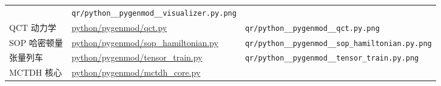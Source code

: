 \documentclass[
]{ctexbook}
\begin{document}
\begin{longtable}[]{@{}lll@{}}
\begin{minipage}[t]{0.30\columnwidth}
\end{minipage} & \begin{minipage}[t]{0.30\columnwidth}\raggedright
\texttt{qr/python\_\_pygenmod\_\_visualizer.py.png}\strut
\end{minipage}\tabularnewline
\begin{minipage}[t]{0.30\columnwidth}\raggedright
QCT 动力学\strut
\end{minipage} & \begin{minipage}[t]{0.30\columnwidth}\raggedright
\href{https://github.com/l1Ha/QuantumGeneralModule/blob/main/python/pygenmod/qct.py}{python/pygenmod/qct.py}\strut
\end{minipage} & \begin{minipage}[t]{0.30\columnwidth}\raggedright
\texttt{qr/python\_\_pygenmod\_\_qct.py.png}\strut
\end{minipage}\tabularnewline
\begin{minipage}[t]{0.30\columnwidth}\raggedright
SOP 哈密顿量\strut
\end{minipage} & \begin{minipage}[t]{0.30\columnwidth}\raggedright
\href{https://github.com/l1Ha/QuantumGeneralModule/blob/main/python/pygenmod/sop_hamiltonian.py}{python/pygenmod/sop\_hamiltonian.py}\strut
\end{minipage} & \begin{minipage}[t]{0.30\columnwidth}\raggedright
\texttt{qr/python\_\_pygenmod\_\_sop\_hamiltonian.py.png}\strut
\end{minipage}\tabularnewline
\begin{minipage}[t]{0.30\columnwidth}\raggedright
张量列车\strut
\end{minipage} & \begin{minipage}[t]{0.30\columnwidth}\raggedright
\href{https://github.com/l1Ha/QuantumGeneralModule/blob/main/python/pygenmod/tensor_train.py}{python/pygenmod/tensor\_train.py}\strut
\end{minipage} & \begin{minipage}[t]{0.30\columnwidth}\raggedright
\texttt{qr/python\_\_pygenmod\_\_tensor\_train.py.png}\strut
\end{minipage}\tabularnewline
\begin{minipage}[t]{0.30\columnwidth}\raggedright
MCTDH 核心\strut
\end{minipage} & \begin{minipage}[t]{0.30\columnwidth}\raggedright
\href{https://github.com/l1Ha/QuantumGeneralModule/blob/main/python/pygenmod/mctdh_core.py}{python/pygenmod/mctdh\_core.py}\strut

\end{minipage}
\end{longtable}
\end{document}
